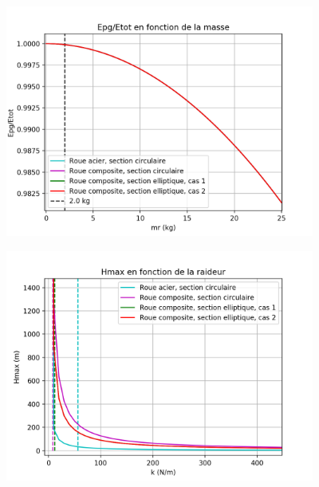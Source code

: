 \begin{figure}[htb]
\centering
\includegraphics[width=4in]{images_2ddl/epm.png}
\caption{}
\label{fig:epm}
\end{figure}

\begin{figure}[htb]
\centering
\includegraphics[width=4in]{images_2ddl/hmaxk.png}
\caption{}
\label{fig:hmaxk}
\end{figure}

\\
\\

